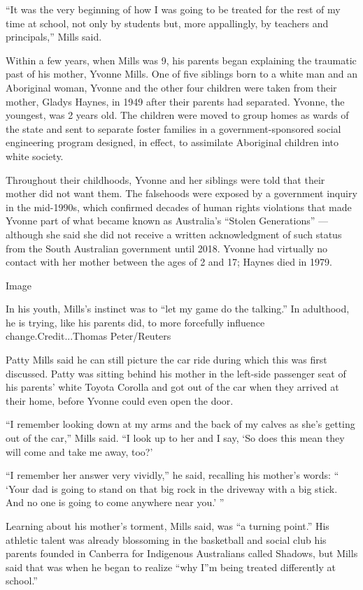 ``It was the very beginning of how I was going to be treated for the
rest of my time at school, not only by students but, more appallingly,
by teachers and principals,'' Mills said.

Within a few years, when Mills was 9, his parents began explaining the
traumatic past of his mother, Yvonne Mills. One of five siblings born to
a white man and an Aboriginal woman, Yvonne and the other four children
were taken from their mother, Gladys Haynes, in 1949 after their parents
had separated. Yvonne, the youngest, was 2 years old. The children were
moved to group homes as wards of the state and sent to separate foster
families in a government-sponsored social engineering program designed,
in effect, to assimilate Aboriginal children into white society.

Throughout their childhoods, Yvonne and her siblings were told that
their mother did not want them. The falsehoods were exposed by a
government inquiry in the mid-1990s, which confirmed decades of human
rights violations that made Yvonne part of what became known as
Australia's ``Stolen Generations'' --- although she said she did not
receive a written acknowledgment of such status from the South
Australian government until 2018. Yvonne had virtually no contact with
her mother between the ages of 2 and 17; Haynes died in 1979.

Image

In his youth, Mills's instinct was to ``let my game do the talking.'' In
adulthood, he is trying, like his parents did, to more forcefully
influence change.Credit...Thomas Peter/Reuters

Patty Mills said he can still picture the car ride during which this was
first discussed. Patty was sitting behind his mother in the left-side
passenger seat of his parents' white Toyota Corolla and got out of the
car when they arrived at their home, before Yvonne could even open the
door.

``I remember looking down at my arms and the back of my calves as she's
getting out of the car,'' Mills said. ``I look up to her and I say, `So
does this mean they will come and take me away, too?'

``I remember her answer very vividly,'' he said, recalling his mother's
words: `` `Your dad is going to stand on that big rock in the driveway
with a big stick. And no one is going to come anywhere near you.' ''

Learning about his mother's torment, Mills said, was ``a turning
point.'' His athletic talent was already blossoming in the basketball
and social club his parents founded in Canberra for Indigenous
Australians called Shadows, but Mills said that was when he began to
realize ``why I''m being treated differently at school.''

